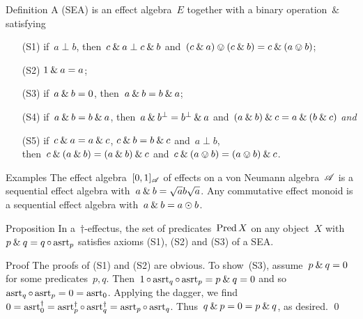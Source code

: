 \documentclass[b]{subfiles}
\begin{document}
\begin{parsec}
\begin{point}
\begin{point}
    \cite{li2011sequential,gudder2005open,shen2009not,gudder2005uniqueness,jun2009remarks,weihua2009uniqueness,tkadlec2008atomic,jia2010entropy,arias2004almost}
\end{point}
\end{point}
\begin{point}{Definition}%
A  (SEA)
    is an effect algebra~$E$ together
    with a binary operation~$\&$
    satisfying
\begin{enumerate}
    \item[(S1)] if~$a \perp b$,
        then~$c \mathbin{\&} a \perp c \mathbin{\&} b$
        and~$(c \mathbin{\&} a) \ovee (c \mathbin{\&} b)
                = c \mathbin{\&} (a \ovee b)$;
    \item[(S2)] $1 \mathbin{\&} a =a$;
    \item[(S3)] if~$a \mathbin{\&} b = 0$,
            then~$a \mathbin{\&} b = b \mathbin{\&} a$;
    \item[(S4)]
        if~$a \mathbin{\&} b = b \mathbin{\&} a$,
        then~$a \mathbin{\&} b^\perp = b^\perp \mathbin{\&} a$
        and~$(a \mathbin{\&} b) \mathbin{\&} c
            = a \mathbin{\&} (b \mathbin{\&} c) $ \emph{and}
    \item[(S5)]
        if~$c \mathbin{\&} a = a \mathbin{\&} c$,
        $c \mathbin{\&} b = b \mathbin{\&} c$ and~$a \perp b$,\\
        then~$c \mathbin{\&} (a \mathbin{\&} b)
                = (a \mathbin{\&} b) \mathbin{\&} c$
                and~$c \mathbin{\&} (a \ovee b) = (a \ovee b) \mathbin{\&} c$.
\end{enumerate}
\end{point}
\begin{point}{Examples}%
The effect algebra~$[0,1]_{\mathscr{A}}$
    of effects on a von Neumann algebra~$\mathscr{A}$
    is a sequential effect algebra with~$a \mathbin{\&} b = \sqrt{a}b\sqrt{a}$.
Any commutative effect monoid is a sequential effect algebra
    with~$a \mathbin{\&} b = a \odot b$.
\end{point}
\begin{point}{Proposition}%
In a~$\dagger$-effectus,
    the set of predicates~$\operatorname{Pred} X$ on any object~$X$
    with~$p \mathbin{\&} q = q \mathop{\circ} \mathrm{asrt}_p$
    satisfies axioms (S1), (S2) and (S3) of a SEA.
\begin{point}{Proof}%
The proofs of (S1) and (S2) are obvious.
To show~(S3), assume~$p \mathbin{\&} q = 0$
    for some predicates~$p,q$.
    Then~$1 \mathop{\circ} \mathrm{asrt}_q \mathop{\circ} \mathrm{asrt}_p  = p \mathbin{\&} q= 0$
and so~$\mathrm{asrt}_q \mathop{\circ} \mathrm{asrt}_p = 0 = \mathrm{asrt}_0$.
Applying the dagger, we find
$0 = \mathrm{asrt}_0^\dagger = \mathrm{asrt}_p^\dagger \mathop{\circ} \mathrm{asrt}_q^\dagger
                = \mathrm{asrt}_p \mathop{\circ} \mathrm{asrt}_q$.
    Thus~$q \mathbin{\&} p = 0 = p \mathbin{\&} q$, as desired. \qed
\end{point}
\end{point}
\end{parsec}
\end{document}
